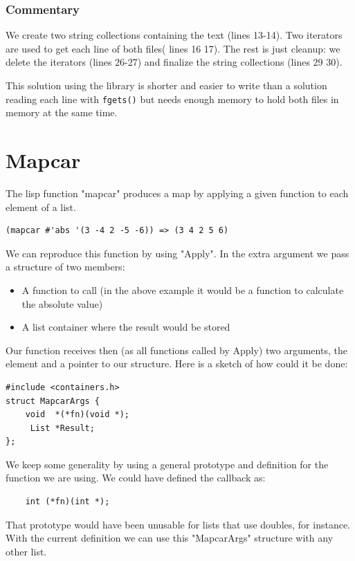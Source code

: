 \documentclass[12pt,a4paper]{memoir} %
\begin{document}
{{\subsubsection{Commentary}
We create two string collections containing the text (lines 13-14). Two iterators are used to get each line of both files( lines 16 17). The rest
is just cleanup: we delete the iterators (lines 26-27) and finalize the string collections (lines 29 30).

This solution using the library is shorter and easier to write than a solution reading each line with \verb,fgets(), but needs enough memory
to hold both files in memory at the same time.
\section{Mapcar}
The lisp function "mapcar" produces a map by applying a given function to each element of a list.
\begin{verbatim}
(mapcar #'abs '(3 -4 2 -5 -6)) => (3 4 2 5 6) 
\end{verbatim}
We can reproduce this function by using "Apply". In the extra argument we pass a structure of two members: 
\begin{itemize}
\item A function to call (in the above example it would be a function to calculate the absolute value)
\item A list container where the result would be stored
\end{itemize}
Our function receives then (as all functions called by Apply) two arguments, the element and a pointer to our structure. Here is a sketch of how could it be done:
\begin{verbatim}
#include <containers.h>
struct MapcarArgs {
    void  *(*fn)(void *);
     List *Result;
};
\end{verbatim}
We keep some generality by using a general prototype and definition for the function we are using. We could have defined the callback as:
\begin{verbatim}
    int (*fn)(int *);
\end{verbatim}
That prototype would have been unusable for lists that use doubles, for instance. With the current definition we can use this "MapcarArgs" structure with any other list.

}}
\end{document}
